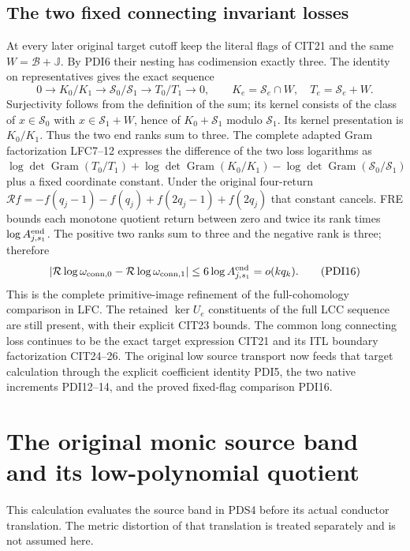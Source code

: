 \documentclass[10pt]{article}
\begin{document}
\subsection{The two fixed connecting invariant losses}

At every later original target cutoff keep the literal flags
of CIT21 and the same $W=\mathscr B+\mathbb J$.
By PDI6 their nesting has codimension exactly three.
The identity on representatives gives the exact sequence
\[
 0\longrightarrow K_0/K_1\longrightarrow
 \mathscr S_0/\mathscr S_1\longrightarrow
 T_0/T_1\longrightarrow0,\qquad
 K_e=\mathscr S_e\cap W,\quad T_e=\mathscr S_e+W .
 \tag{PDI15}
\]
Surjectivity follows from the definition of the sum; its
kernel consists of the class of $x\in\mathscr S_0$ with
$x\in\mathscr S_1+W$, hence of $K_0+\mathscr S_1$ modulo
$\mathscr S_1$. Its kernel presentation is $K_0/K_1$.
Thus the two end ranks sum to three.
The complete adapted Gram factorization LFC7--12 expresses
the difference of the two loss logarithms as
$\log\det\operatorname{Gram}(T_0/T_1)
+\log\det\operatorname{Gram}(K_0/K_1)
-\log\det\operatorname{Gram}(\mathscr S_0/\mathscr S_1)$
plus a fixed coordinate constant. Under the original four-return
$\mathcal Rf=-f(q_j-1)-f(q_j)+f(2q_j-1)+f(2q_j)$ that
constant cancels. FRE bounds each monotone quotient return
between zero and twice its rank times
$\log A_{j,s_1}^{\rm end}$. The positive two ranks sum to
three and the negative rank is three; therefore
\[
 \left|\mathcal R\log\omega_{{\rm conn},0}
        -\mathcal R\log\omega_{{\rm conn},1}\right|
 \le6\log A_{j,s_1}^{\rm end}=o(kq_k).
 \tag{PDI16}
\]
This is the complete primitive-image refinement of the
full-cohomology comparison in LFC. The retained
$\ker U_e$ constituents of the full LCC sequence are still
present, with their explicit CIT23 bounds. The common long
connecting loss continues to be the exact target expression
CIT21 and its ITL boundary factorization CIT24--26. The
original low source transport now feeds that target calculation
through the explicit coefficient identity PDI5, the two
native increments PDI12--14, and the proved fixed-flag
comparison PDI16.


\section{The original monic source band and its low-polynomial quotient}
\label{sec:PSG}
This calculation evaluates the source band in PDS4 before its actual
conductor translation. The metric distortion of that translation is
treated separately and is not assumed here.
\end{document}
